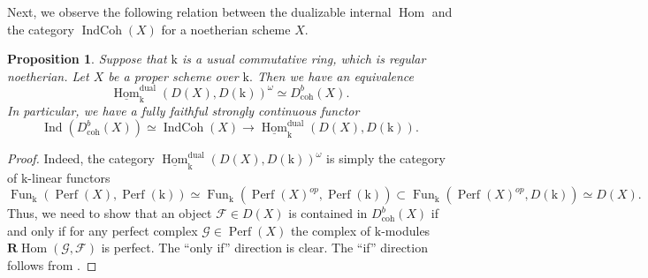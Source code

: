 \documentclass[11pt,leqno]{amsart}
\newcommand{\Implies}[2]{$\text{\ref{#1}}\implies\text{\ref{#2}}$}
\newtheorem{lemma}[theo]{Lemma}
\newtheorem{prop}[theo]{Proposition}
\numberwithin{equation}{section}
\def\coh{\operatorname{coh}}
\def\bR{{\mathbf R}}
\def\Hom{\operatorname{Hom}}
\newcommand{\IndCoh}{\operatorname{IndCoh}}
\newcommand{\dual}{\operatorname{dual}}
\newcommand{\mk}{\mathrm k}
\newcommand{\cF}{{\mathcal F}}
\newcommand{\cG}{{\mathcal G}}
\newcommand{\un}{\underline}
\newcommand{\Fun}{\operatorname{Fun}}
\newcommand{\Perf}{\operatorname{Perf}}
\newcommand{\Ind}{\operatorname{Ind}}
\begin{document}
Next, we observe the following relation between the dualizable internal $\Hom$ and the category $\IndCoh(X)$ for a noetherian scheme $X.$

\begin{prop}\label{prop:IndCoh_and_Hom^dual}
Suppose that $\mk$ is a usual commutative ring, which is regular noetherian. Let $X$ be a proper scheme over $\mk.$ Then we have an equivalence
\begin{equation*}
\un{\Hom}_{\mk}^{\dual}(D(X),D(\mk))^{\omega}\simeq D^b_{\coh}(X).
\end{equation*}
In particular, we have a fully faithful strongly continuous functor
\begin{equation}\label{eq:IndCoh_to_Hom^dual}
\Ind(D^b_{\coh}(X))\simeq \IndCoh(X)\to \un{\Hom}_{\mk}^{\dual}(D(X),D(\mk)).
\end{equation}
\end{prop}  





\begin{proof}
Indeed, the category $\un{\Hom}_{\mk}^{\dual}(D(X),D(\mk))^{\omega}$ is simply the category of $\mk$-linear functors 
\begin{equation*}
\Fun_{\mk}(\Perf(X),\Perf(\mk))\simeq \Fun_{\mk}(\Perf(X)^{op},\Perf(\mk))\subset \Fun_{\mk}(\Perf(X)^{op},D(\mk))\simeq D(X).
\end{equation*} Thus, we need to show that an object $\cF\in D(X)$ is contained in $D^b_{\coh}(X)$ if and only if for any perfect complex $\cG\in\Perf(X)$ the complex of $\mk$-modules $\bR\Hom(\cG,\cF)$ is perfect. The ``only if'' direction is clear. The ``if'' direction follows from \cite[Corollary 0.5]{Nee18}.
\end{proof}
\end{document}
